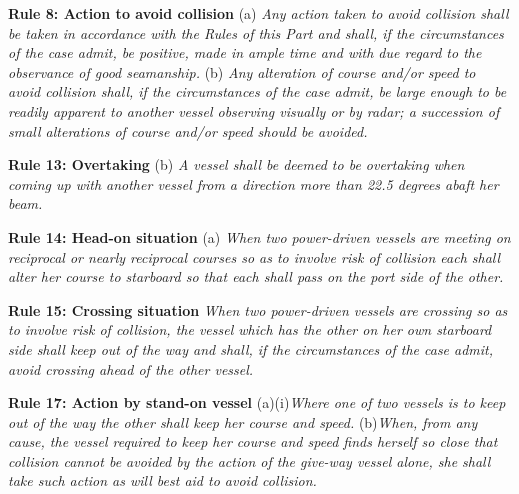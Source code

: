 \textbf{Rule 8: Action to avoid collision}\newline
(a) \textit{Any action taken to avoid collision shall be taken in accordance with the Rules of this Part and shall, 
if the circumstances of the case admit, be positive, made in ample time and with due regard to the observance of good seamanship.}\newline
(b) \textit{Any alteration of course and/or speed to avoid collision shall, if the circumstances of the case admit, be large enough to be readily 
apparent to another vessel observing visually or by radar; a succession of small alterations of course and/or speed should be avoided.}

\textbf{Rule 13: Overtaking}\newline
(b) \textit{A vessel shall be deemed to be overtaking when coming up with another vessel from a direction more than 22.5 degrees abaft her beam.}

\textbf{Rule 14: Head-on situation}\newline
(a) \textit{When two power-driven vessels are meeting on reciprocal or nearly reciprocal courses so as to involve risk of collision each shall alter her 
course to starboard so that each shall pass on the port side of the other.}

\textbf{Rule 15: Crossing situation}\newline
\textit{When two power-driven vessels are crossing so as to involve risk of collision, the vessel which has the other on her own starboard 
side shall keep out of the way and shall, if the circumstances of the case admit, avoid crossing ahead of the other vessel.}

\textbf{Rule 17: Action by stand-on vessel}\newline
(a)(i)\textit{Where one of two vessels is to keep out of the way the other shall keep her course and speed.}\newline
(b)\textit{When, from any cause, the vessel required to keep her course and speed finds herself so close that collision 
cannot be avoided by the action of the give-way vessel alone, she shall take such action as will best aid to avoid collision.}

